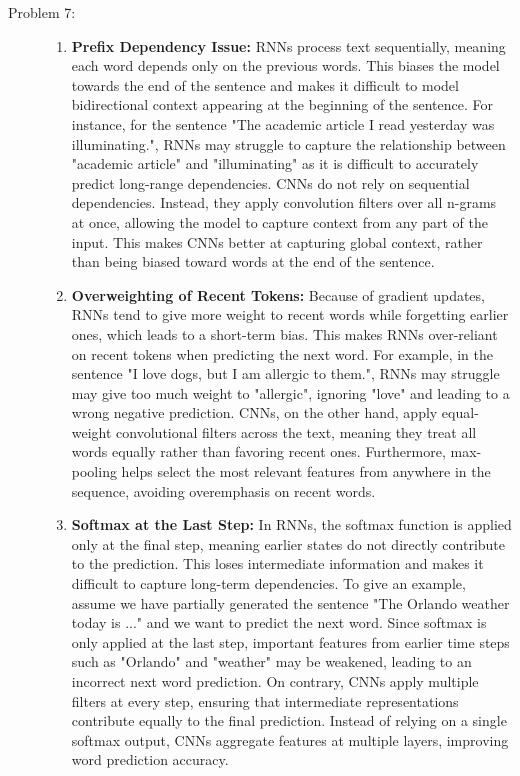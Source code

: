 \documentclass[10pt]{article}
\begin{document}
\begin{description}
\pagebreak

\item[Problem 7:] \hfill %

\begin{enumerate}
    \item \textbf{Prefix Dependency Issue:} RNNs process text sequentially, meaning each word depends only on the previous words.
    This biases the model towards the end of the sentence and makes it difficult to model bidirectional context appearing at the beginning of the sentence.
    For instance, for the sentence "The academic article I read yesterday was illuminating.", RNNs may struggle to capture the relationship between "academic article" and "illuminating"
    as it is difficult to accurately predict long-range dependencies. 
    CNNs do not rely on sequential dependencies. 
    Instead, they apply convolution filters over all n-grams at once, allowing the model to capture context from any part of the input.
    This makes CNNs better at capturing global context, rather than being biased toward words at the end of the sentence.
    \item \textbf{Overweighting of Recent Tokens:} Because of gradient updates, RNNs tend to give more weight to recent words while forgetting earlier ones, 
    which leads to a short-term bias. This makes RNNs over-reliant on recent tokens when predicting the next word.
    For example, in the sentence "I love dogs, but I am allergic to them.", RNNs may struggle may give too much weight to "allergic", ignoring "love" and leading to a wrong negative
    prediction.
    CNNs, on the other hand, apply equal-weight convolutional filters across the text, meaning they treat all words equally rather than favoring recent ones.
    Furthermore, max-pooling helps select the most relevant features from anywhere in the sequence, avoiding overemphasis on recent words.
    \item \textbf{Softmax at the Last Step:} In RNNs, the softmax function is applied only at the final step, meaning earlier states do not directly 
    contribute to the prediction. This loses intermediate information and makes it difficult to capture long-term dependencies.
    To give an example, assume we have partially generated the sentence "The Orlando weather today is ..." and we want to predict the next word.
    Since softmax is only applied at the last step, important features from earlier time steps such as "Orlando" and "weather" may be weakened, 
    leading to an incorrect next word prediction.
    On contrary, CNNs apply multiple filters at every step, ensuring that intermediate representations contribute equally to the final prediction.
    Instead of relying on a single softmax output, CNNs aggregate features at multiple layers, improving word prediction accuracy.
\end{enumerate}

\end{description}
\end{document}
